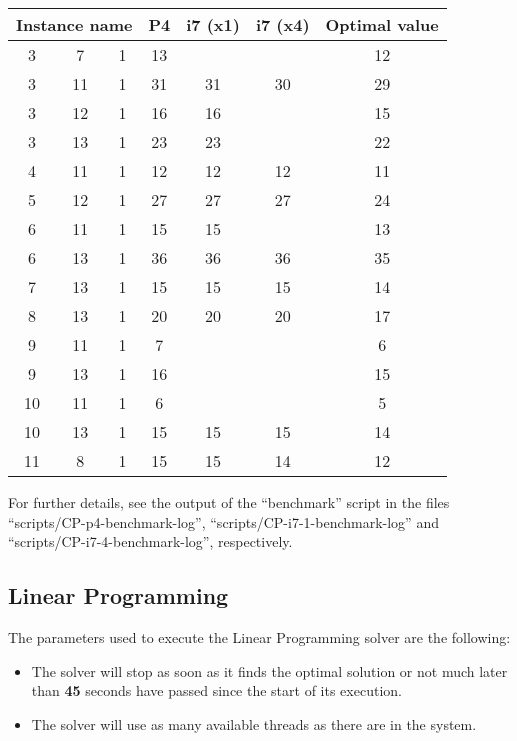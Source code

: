\begin{table}[H]
\centering
	\begin{tabular}{ccccccc}
		\multicolumn{3}{c}{Instance name}
					& P4		& i7 (x1)	& i7 (x4)	& Optimal value \\
		\midrule
		 3 &  7 & 1	& 13		&  			&  			& 12 \\
		 3 & 11 & 1	& 31		&  31		& 30			& 29 \\
		 3 & 12 & 1	& 16		&  16		&  			& 15 \\
		 3 & 13 & 1	& 23		&  23		&  			& 22 \\
		 4 & 11 & 1	& 12		&  12		& 12			& 11 \\
		 5 & 12 & 1	& 27		&  27		& 27			& 24 \\
		 6 & 11 & 1	& 15		&  15		&  			& 13 \\
		 6 & 13 & 1	& 36		&  36		& 36			& 35 \\
		 7 & 13 & 1	& 15		&  15		& 15			& 14 \\
		 8 & 13 & 1	& 20		&  20		& 20			& 17 \\
		 9 & 11 & 1	&  7		&   			&  			&  6 \\
		 9 & 13 & 1	& 16		&   			&  			& 15 \\
		10 & 11 & 1	&  6		&   			&  			&  5 \\
		10 & 13 & 1	& 15		&  15		& 15			& 14 \\
		11 &  8 & 1	& 15		&  15		& 14			& 12 \\
	\end{tabular}
	\label{table:CP-results:suboptimalinstances}
\end{table}

For further details, see the output of the ``benchmark'' script in the files
``scripts/CP-p4-benchmark-log'', ``scripts/CP-i7-1-benchmark-log'' and
``scripts/CP-i7-4-benchmark-log'', respectively.

\subsection{Linear Programming}
\label{sec:benchmarking:linear-programming}

The parameters used to execute the Linear Programming solver are the following:
\begin{itemize}
	\item The solver will stop as soon as it finds the optimal solution or not much
	later than \textbf{45} seconds have passed since the start of its execution.
	\item The solver will use as many available threads as there are in the system.
\end{itemize}


